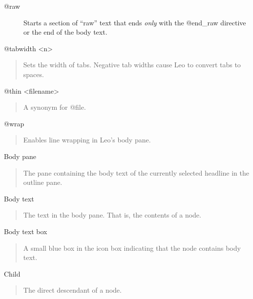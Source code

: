 \documentclass[a4paper,10pt,english]{sphinxmanual}
\begin{document}
\begin{description}
\item[{@raw}] \leavevmode
Starts a section of ``raw'' text that ends \emph{only} with the
@end\_raw directive or the end of the body text.

\end{description}

@tabwidth \textless{}n\textgreater{}
\begin{quote}

Sets the width of tabs. Negative tab widths cause Leo to convert tabs to
spaces.
\end{quote}

@thin \textless{}filename\textgreater{}
\begin{quote}

A synonym for @file.
\end{quote}

@wrap
\begin{quote}

Enables line wrapping in Leo's body pane.
\end{quote}

Body pane
\begin{quote}

The pane containing the body text of the currently selected headline in the
outline pane.
\end{quote}

Body text
\begin{quote}

The text in the body pane. That is, the contents of a node.
\end{quote}

Body text box
\begin{quote}

A small blue box in the icon box indicating that the node contains body
text.
\end{quote}

Child
\begin{quote}

The direct descendant of a node.
\end{quote}
\end{document}
